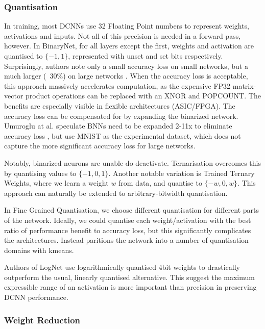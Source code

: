 \documentclass[12pt]{article}
\begin{document}
\subsubsection{Quantisation}
In training, most DCNNs use 32 Floating Point numbers to represent weights, activations and inputs.
Not all of this precision is needed in a forward pass, however.
In BinaryNet, for all layers except the first, weights and activation are quantised to $\{-1, 1\}$, represented with unset and set bits respectively.
Surprisingly, authors note only a small accuracy loss on small networks\cite{courbariaux2016binarynet}, but a much larger (~30\%) on large networks \cite{wang2019deep}.
When the accuracy loss is acceptable, this approach massively accelerates computation, as the expensive FP32 matrix-vector product operations can be replaced with an XNOR and POPCOUNT\cite{courbariaux2016binarynet}.
The benefits are especially visible in flexible architectures (ASIC/FPGA).
The accuracy loss can be compensated for by expanding the binarized network.
Umuroglu at al. speculate BNNs need to be expanded 2-11x to eliminate accuracy loss \cite{umuroglu2016finn},
but use MNIST as the experimental dataset, which does not capture the more significant accuracy loss for large networks.

Notably, binarized neurons are unable do deactivate. Ternarisation overcomes this by quantising values to $\{-1, 0, 1\}$.
Another notable variation is Trained Ternary Weights, where we learn a weight $w$ from data, and quantise to $\{-w, 0 ,w\}$.
This approach can naturally be extended to arbitrary-bitwidth quantisation.

In Fine Grained Quantisation, we choose different quantisation for different parts of the network.
Ideally, we could quantise each weight/activation with the best ratio of performance benefit to accuracy loss,
but this significantly complicates the architectures.
Instead \cite{wu2016quantized} paritions the network into a number of quantisation domains with kmeans.

Authors of LogNet\cite{lee2017lognet} use logarithmically quantised 4bit weights to drastically outperform the usual, linearly quantised alternative.
This suggest the maximum expressible range of an activation is more important than precision in preserving DCNN performance.

\subsubsection{Weight Reduction}
\end{document}
